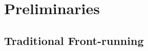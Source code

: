 

\section{Preliminaries}

\subsection{Traditional Front-running} 
\label{sec:What is front-running?}

